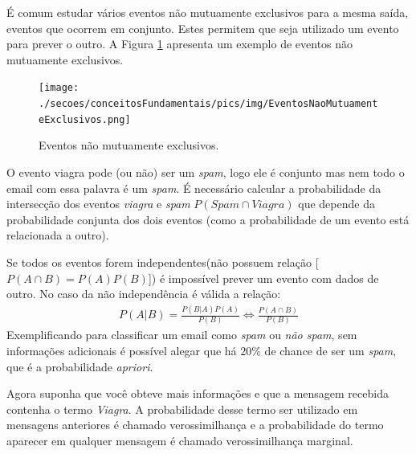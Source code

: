 É comum estudar vários eventos não mutuamente exclusivos para a mesma saída, eventos que ocorrem em conjunto. Estes permitem que seja utilizado um evento para prever o outro. A Figura \ref{FIGURA_EVENTOS_NAO_MUTUAMENTE_EXCLUSIVOS} apresenta um exemplo de eventos não mutuamente exclusivos.
\begin{figure}[H]
	\centering
 	  \caption{Eventos não mutuamente exclusivos.}
		\texttt{[image: ./secoes/conceitosFundamentais/pics/img/EventosNaoMutuamenteExclusivos.png]}
	\label{FIGURA_EVENTOS_NAO_MUTUAMENTE_EXCLUSIVOS}
\end{figure}
O evento viagra pode (ou não) ser um \emph{spam}, logo ele é conjunto mas nem todo o email com essa palavra é um \emph{spam}. É necessário calcular a probabilidade da intersecção dos eventos \emph{viagra} e \emph{spam} \(P(Spam \cap Viagra)\) que depende da probabilidade conjunta dos dois eventos (como a probabilidade de um evento está relacionada a outro).

Se todos os eventos forem independentes(não possuem relação [\(P(A \cap B) = P(A)P(B)\)]) é impossível prever um evento com dados de outro. No caso da não independência é válida a relação:
\begin{align}
P(A|B) =  \frac{P(B|A)P(A)}{P(B)} \Leftrightarrow \frac{P(A \cap B)}{P(B)} \label{BAYES}
\end{align}
Exemplificando para classificar um email como \emph{spam} ou \emph{não spam}, sem informações adicionais é possível alegar que há \(20\%\) de chance de ser um \emph{spam}, que é a probabilidade \emph{apriori}.

Agora suponha que você obteve mais informações e que a mensagem recebida contenha o termo \emph{Viagra}. A probabilidade desse termo ser utilizado em mensagens anteriores é chamado verossimilhança e a probabilidade do termo aparecer em qualquer mensagem é chamado verossimilhança marginal.

